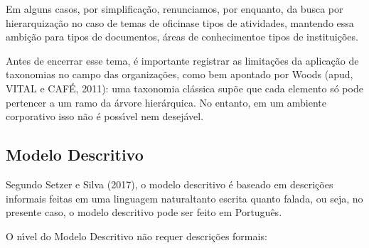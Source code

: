 \documentclass[
12pt,		%
openright,	%
twoside,  %
a4paper,			%
chapter=TITLE,		%
english,			%
french,				%
spanish,			%
brazil				%
]{USPSC-classe/USPSC}
\begin{document}
Em alguns casos, por simplifica\c{c}\~ao, renunciamos, por enquanto, da busca por hierarquiza\c{c}\~ao no caso de \textquotedbl temas de oficinas\textquotedbl  e \textquotedbl tipos de atividades\textquotedbl , mantendo essa ambi\c{c}\~ao para \textquotedbl tipos de documentos\textquotedbl , \textquotedbl \'areas de conhecimento\textquotedbl  e \textquotedbl tipos de institui\c{c}\~oes\textquotedbl .









Antes de encerrar esse tema, \'e importante registrar as limita\c{c}\~oes da aplica\c{c}\~ao de taxonomias no campo das organiza\c{c}\~oes, como bem apontado por Woods  (apud, VITAL e CAF\'E, 2011): \textquotedbl uma taxonomia cl\'assica sup\~oe que cada elemento s\'o pode pertencer a um ramo da \'arvore hier\'arquica. No entanto, em um ambiente corporativo isso n\~ao \'e poss\'{\i}vel nem desej\'avel\textquotedbl .









\subsection[Modelo Descritivo]{Modelo Descritivo}\label{Modelo Descritivo}
Segundo Setzer e Silva (2017), o modelo descritivo \'e baseado em \textquotedbl descri\c{c}\~oes informais feitas em uma linguagem natural\textquotedbl  tanto escrita quanto falada, ou seja, no presente caso, o modelo descritivo pode ser feito em Portugu\^es.









O n\'{\i}vel do Modelo Descritivo n\~ao requer descri\c{c}\~oes formais:










\noindent\begin{center}\mbox{\centering{}}\end{center}
\end{document}
